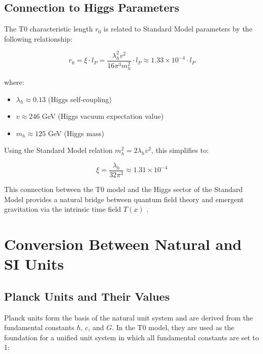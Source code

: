 \documentclass[12pt,a4paper]{article}
\newcommand{\Tfield}{T(x)}
\begin{document}
	\subsection{Connection to Higgs Parameters}
	
	The T0 characteristic length $r_0$ is related to Standard Model parameters by the following relationship:
	
	\begin{equation}
		r_0 = \xi \cdot l_P = \frac{\lambda_h^2v^2}{16\pi^3m_h^2} \cdot l_P \approx 1.33 \times 10^{-4} \cdot l_P
	\end{equation}
	
	where:
	\begin{itemize}
		\item $\lambda_h \approx 0.13$ (Higgs self-coupling)
		\item $v \approx 246$ GeV (Higgs vacuum expectation value)
		\item $m_h \approx 125$ GeV (Higgs mass)
	\end{itemize}
	
	Using the Standard Model relation $m_h^2 = 2\lambda_h v^2$, this simplifies to:
	
	\begin{equation}
		\xi = \frac{\lambda_h}{32\pi^3} \approx 1.31 \times 10^{-4}
	\end{equation}
	
	This connection between the T0 model and the Higgs sector of the Standard Model provides a natural bridge between quantum field theory and emergent gravitation via the intrinsic time field $\Tfield$ \cite{pascher_higgs_2025}.
	
	\section{Conversion Between Natural and SI Units}
	
	\subsection{Planck Units and Their Values}
	
	Planck units form the basis of the natural unit system and are derived from the fundamental constants $\hbar$, $c$, and $G$. In the T0 model, they are used as the foundation for a unified unit system in which all fundamental constants are set to 1:
	
\end{document}
